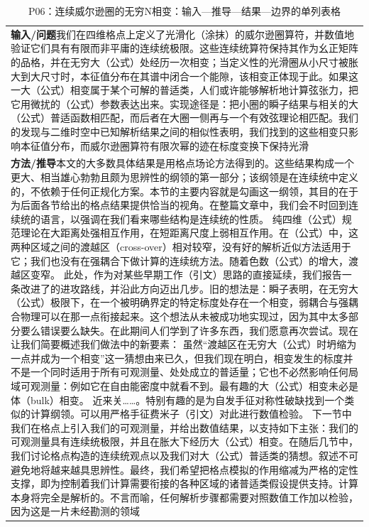 \documentclass[UTF8,11pt,oneside]{ctexbook}
\begin{document}
\begin{table}[htbp]
  \centering
  \caption*{P06：连续威尔逊圈的无穷N相变：输入—推导—结果—边界的单列表格}
  \small
  \begin{tabular}{@{}p{}@{}}
    \toprule
    \textbf{输入/问题}\quad 我们在四维格点上定义了光滑化（涂抹）的威尔逊圈算符，并数值地验证它们具有有限而非平庸的连续统极限。这些连续统算符保持其作为幺正矩阵的品格，并在无穷大（公式）处经历一次相变；当定义性的光滑圈从小尺寸被胀大到大尺寸时，本征值分布在其谱中闭合一个能隙，该相变正体现于此。如果这一大（公式）相变属于某个可解的普适类，人们或许能够解析地计算弦张力，把它用微扰的（公式）参数表达出来。实现途径是：把小圈的瞬子结果与相关的大（公式）普适函数相匹配，而后者在大圈一侧再与一个有效弦理论相匹配。我们的发现与二维时空中已知解析结果之间的相似性表明，我们找到的这些相变只影响本征值分布，而威尔逊圈算符有限次幂的迹在标度变换下保持光滑 \\
    \textbf{方法/推导}\quad 本文的大多数具体结果是用格点场论方法得到的。这些结果构成一个更大、相当雄心勃勃且颇为思辨性的纲领的第一部分；该纲领是在连续统中定义的，不依赖于任何正规化方案。本节的主要内容就是勾画这一纲领，其目的在于为后面各节给出的格点结果提供恰当的视角。在整篇文章中，我们会不时回到连续统的语言，以强调在我们看来哪些结构是连续统的性质。 纯四维（公式）规范理论在大距离处强相互作用，在短距离尺度上弱相互作用。在（公式）中，这两种区域之间的渡越区（cross-over）相对较窄，没有好的解析近似方法适用于它；我们也没有在强耦合下做计算的连续统方法。随着色数（公式）的增大，渡越区变窄。 此处，作为对某些早期工作（引文）思路的直接延续，我们报告一条改进了的进攻路线，并沿此方向迈出几步。旧的想法是：瞬子表明，在无穷大（公式）极限下，在一个被明确界定的特定标度处存在一个相变，弱耦合与强耦合物理可以在那一点衔接起来。这个想法从未被成功地实现过，因为其中太多部分要么错误要么缺失。在此期间人们学到了许多东西，我们愿意再次尝试。现在让我们简要概述我们做法中的新要素： 虽然``渡越区在无穷大（公式）时坍缩为一点并成为一个相变''这一猜想由来已久，但我们现在明白，相变发生的标度并不是一个同时适用于所有可观测量、处处成立的普适量；它也不必然影响任何局域可观测量：例如它在自由能密度中就看不到。最有趣的大（公式）相变未必是体（bulk）相变。 近来关……。特别有趣的是为自发手征对称性破缺找到一个类似的计算纲领。可以用严格手征费米子（引文）对此进行数值检验。 下一节中我们在格点上引入我们的可观测量，并给出数值结果，以支持如下主张：我们的可观测量具有连续统极限，并且在胀大下经历大（公式）相变。在随后几节中，我们讨论格点构造的连续统观点以及我们对大（公式）普适类的猜想。叙述不可避免地将越来越具思辨性。最终，我们希望把格点模拟的作用缩减为严格的定性支撑，即为控制着我们计算需要衔接的各种区域的诸普适类假设提供支持。计算本身将完全是解析的。不言而喻，任何解析步骤都需要对照数值工作加以检验，因为这是一片未经勘测的领域 \\

\end{tabular}
\end{table}
\end{document}
